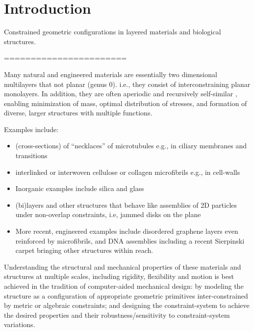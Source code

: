 \section{Introduction}
Constrained geometric configurations in layered materials and biological structures.

=======================

Many natural and engineered materials are essentially two dimensional multilayers 
that not planar (genus 0). i.e., they consist of interconstraining planar monolayers. In addition,
they are often  
aperiodic and recursively self-similar \cite{Intro1}, enabling minimization of mass, 
optimal distribution of stresses, and formation  
of diverse, larger structures with multiple functions.

Examples include:

\begin{itemize}
    \item (cross-sections) of ``necklaces'' of microtubules \cite{Necklace1} e.g., in ciliary membranes and transitions \cite{Necklace2}

    \item interlinked or interwoven cellulose or collagen microfibrils e.g., in cell-walls \cite{CellWalls1} \cite{CellWalls1}

    \item Inorganic examples include silica and glass \cite{SilicaGlass1} \cite{SilicaGlass2}

    \item (bi)layers and other structures that behave like assemblies of 2D particles under non-overlap constraints, i.e, jammed 
    disks on the plane \cite{JammedDisk1}

    \item More recent, engineered examples include disordered graphene layers \cite{Graphene1} \cite{Graphene2}  even reinforced 
    by  microfibrils, and DNA assemblies \cite{Microfibrils1} including a recent Sierpinski carpet bringing other structures 
    \cite{Microfibrils2} within reach.
\end{itemize}

Understanding the structural and mechanical properties of these materials and structures at multiple scales, including rigidity, 
flexibility and motion is best achieved in the tradition of computer-aided mechanical design:  by modeling the structure as a 
configuration of appropriate geometric primitives inter-constrained by metric or algebraic constraints; and designing the 
constraint-system to achieve the desired properties and their robustness/sensitivity to constraint-system variations.

